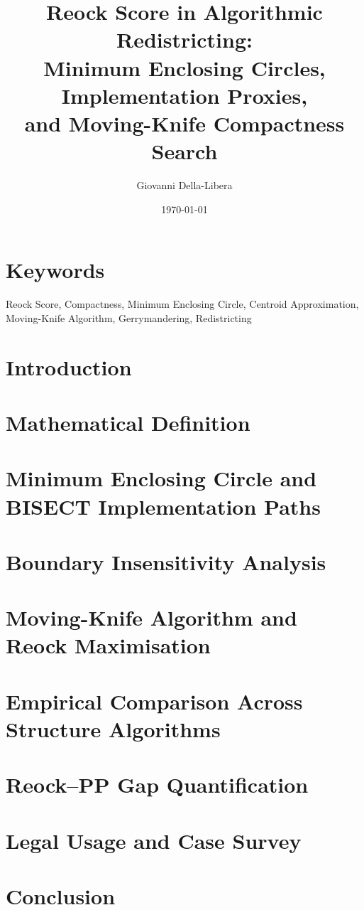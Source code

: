 \documentclass[12pt]{article}
\title{\textbf{Reock Score in Algorithmic Redistricting:\\
Minimum Enclosing Circles, Implementation Proxies,\\
and Moving-Knife Compactness Search}}
\author{Giovanni Della-Libera}
\date{\today}
\begin{document}
\maketitle

\begin{abstract}

\end{abstract}

\section*{Keywords}
Reock Score, Compactness, Minimum Enclosing Circle, Centroid Approximation,
Moving-Knife Algorithm, Gerrymandering, Redistricting

\section{Introduction}


\section{Mathematical Definition}


\section{Minimum Enclosing Circle and BISECT Implementation Paths}


\section{Boundary Insensitivity Analysis}


\section{Moving-Knife Algorithm and Reock Maximisation}


\section{Empirical Comparison Across Structure Algorithms}


\section{Reock--PP Gap Quantification}


\section{Legal Usage and Case Survey}


\section{Conclusion}




\end{document}
